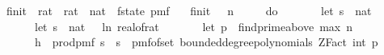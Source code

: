 \begin{isabellebody}
\ f{}{\isacharunderscore}{\kern0pt}init\ {\isacharcolon}{\kern0pt}{\isacharcolon}{\kern0pt}\ {\isachardoublequoteopen}rat\ {\isasymRightarrow}\ rat\ {\isasymRightarrow}\ nat\ {\isasymRightarrow}\ f{}{\isacharunderscore}{\kern0pt}state\ pmf{\isachardoublequoteclose}\ \isanewline
\ \ {\isachardoublequoteopen}f{}{\isacharunderscore}{\kern0pt}init\ {\isasymdelta}\ {\isasymepsilon}\ n\ {\isacharequal}{\kern0pt}\isanewline
\ \ \ \ do\ {\isacharbraceleft}{\kern0pt}\isanewline
\ \ \ \ \ \ let\ s\ {\isacharequal}{\kern0pt}\ nat\ {\isasymlceil}{}\ {\isacharslash}{\kern0pt}\ {\isasymdelta}\isanewline
\ \ \ \ \ \ let\ s\ {\isacharequal}{\kern0pt}\ nat\ {\isasymlceil}{\isacharminus}{\kern0pt}{\isacharparenleft}{\kern0pt}{}{}\ {\isacharasterisk}{\kern0pt}\ ln\ {\isacharparenleft}{\kern0pt}real{\isacharunderscore}{\kern0pt}of{\isacharunderscore}{\kern0pt}rat\ {\isasymepsilon}{\isacharparenright}{\kern0pt}{\isacharparenright}{\kern0pt}{\isasymrceil}{\isacharsemicolon}{\kern0pt}\isanewline
\ \ \ \ \ \ let\ p\ {\isacharequal}{\kern0pt}\ find{\isacharunderscore}{\kern0pt}prime{\isacharunderscore}{\kern0pt}above\ {\isacharparenleft}{\kern0pt}max\ n\ {}{\isacharparenright}{\kern0pt}{\isacharsemicolon}{\kern0pt}\isanewline
\ \ \ \ \ \ h\ {\isasymleftarrow}\ prod{\isacharunderscore}{\kern0pt}pmf\ {\isacharparenleft}{\kern0pt}{\isacharbraceleft}{\kern0pt}{}{\isachardot}{\kern0pt}{\isachardot}{\kern0pt}{\isacharless}{\kern0pt}s\ {\isasymtimes}\ {\isacharbraceleft}{\kern0pt}{}{\isachardot}{\kern0pt}{\isachardot}{\kern0pt}{\isacharless}{\kern0pt}s\ {\isacharparenleft}{\kern0pt}{\isasymlambda}{\isacharunderscore}{\kern0pt}{\isachardot}{\kern0pt}\ pmf{\isacharunderscore}{\kern0pt}of{\isacharunderscore}{\kern0pt}set\ {\isacharparenleft}{\kern0pt}bounded{\isacharunderscore}{\kern0pt}degree{\isacharunderscore}{\kern0pt}polynomials\ {\isacharparenleft}{\kern0pt}ZFact\ {\isacharparenleft}{\kern0pt}int\ p{\isacharparenright}{\kern0pt}{\isacharparenright}{\kern0pt}\ {}{\isacharparenright}{\kern0pt}{\isacharparenright}{\kern0pt}{\isacharsemicolon}{\kern0pt}\isanewline

\end{isabellebody}
